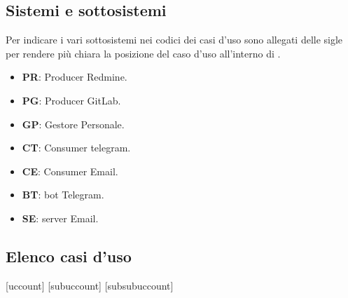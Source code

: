 	\subsection{Sistemi e sottosistemi}
	Per indicare i vari sottosistemi nei codici dei casi d'uso sono allegati delle sigle per rendere più chiara la posizione del caso d'uso all'interno di \progetto.
	\begin{itemize}
		\item \textbf{PR}: Producer Redmine.
		\item \textbf{PG}: Producer GitLab.
		\item \textbf{GP}: Gestore Personale.
		\item \textbf{CT}: Consumer telegram.
		\item \textbf{CE}: Consumer Email.
		\item \textbf{BT}: bot Telegram.
		\item \textbf{SE}: server Email.
	\end{itemize}

	\clearpage

	\subsection{Elenco casi d'uso}


[uccount]
[subuccount]
[subsubuccount]


































\clearpage